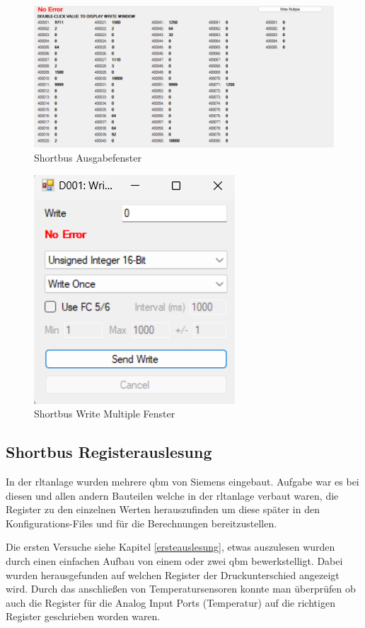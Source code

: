\begin{figure}[H]
	\centering
	\includegraphics[width=1\linewidth]{Bilder/shortbus_ausgabe}
	\caption{Shortbus Ausgabefenster} 
	\label{fig:Shortbusausgabe}
\end{figure}

\begin{figure}[H]
	\centering
	\includegraphics[width=0.3\linewidth]{Bilder/write_multiple_fenster}
	\caption{Shortbus Write Multiple Fenster} 
	\label{fig:writemultiple}
\end{figure}

\subsection{Shortbus Registerauslesung}

In der \ac{rltanlage} wurden mehrere \gls{qbm} von Siemens eingebaut. Aufgabe war es bei diesen und allen andern Bauteilen welche in der \ac{rltanlage} verbaut waren, die Register zu den einzelnen Werten herauszufinden um diese später in den Konfigurations-Files und für die Berechnungen bereitzustellen. 

Die ersten Versuche siehe Kapitel \ref{ersteauslesung}, etwas auszulesen wurden durch einen einfachen Aufbau von einem oder zwei \gls{qbm}  bewerkstelligt. Dabei wurden herausgefunden auf welchen Register der Druckunterschied angezeigt wird. Durch das anschließen von Temperatursensoren konnte man überprüfen ob auch die Register für die Analog Input Ports (Temperatur) auf die richtigen Register geschrieben worden waren.


